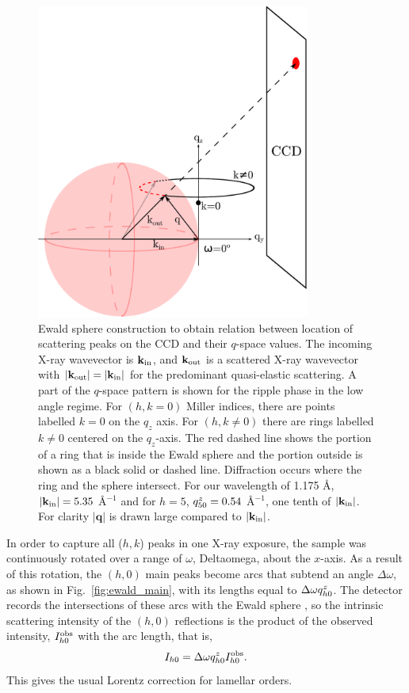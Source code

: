 \begin{figure}[htbp]
  \centering
  \includegraphics[width=0.8\textwidth]{figures/ripple/analysis/ripple_sample_qspace}
  \caption[Ewald sphere construction to obtain relation between location of 
  scattering peaks on the CCD and their $q$-space values]
  {Ewald sphere construction to obtain relation between location of 
  scattering peaks on the CCD and their $q$-space values. The incoming X-ray 
  wavevector is $\mathbf{k}_{\mathrm{in}}$, and $\mathbf{k}_{\mathrm{out}}$ is a scattered X-ray wavevector with 
  $|\mathbf{k}_{\mathrm{out}}|=|\mathbf{k}_{\mathrm{in}}|$ for the predominant quasi-elastic scattering. 
  A part of the $q$-space pattern is shown for the ripple phase in the low angle 
  regime. For $(h, k=0)$ Miller indices, there are points labelled $k=0$ on the 
  $q_z$ axis.  
  For $(h,k\neq0)$ there are rings labelled $k\neq0$ centered on the 
  $q_z$-axis. The red dashed line shows the portion of a ring that is inside 
  the Ewald sphere and the portion outside is shown as a black solid 
  or dashed line. 
  Diffraction occurs where the ring and the sphere intersect. For our wavelength
	of 1.175 \AA, $|\mathbf{k}_{\mathrm{in}}|=5.35$ \AA$^{-1}$ and for $h=5$,
  $q_{50}^z=0.54$ \AA$^{-1}$, one tenth of $|\mathbf{k}_{\mathrm{in}}|$.
  For clarity $|\mathbf{q}|$ is drawn large compared to $|\mathbf{k}_{\mathrm{in}}|$. 
  }
  \label{fig:ripple_sample_qspace}
\end{figure}

In order to capture all ($h, k$) peaks in one X-ray exposure, 
the sample was continuously rotated over a range of $\omega$, \gls{Deltaomega},
about the $x$-axis. As a result of this rotation, 
the $(h, 0)$ main peaks become arcs that subtend an angle $\Delta\omega$,
as shown in Fig.~\ref{fig:ewald_main}, with its lengths
equal to $\Delta\omega q_{h0}^z$. 
The detector records the intersections of these arcs with the 
Ewald sphere \cite{ref:Warren69}, 
so the intrinsic scattering intensity of the $(h, 0)$ reflections
is the product of the observed intensity, $I_{h0}^\textrm{obs}$ with the arc length, that is, 
\begin{equation}
  I_{h0} = \Delta\omega q_{h0}^z I_{h0}^\textrm{obs}. \label{eq:main_ewald}
\end{equation}
This gives the usual Lorentz correction for lamellar orders.

